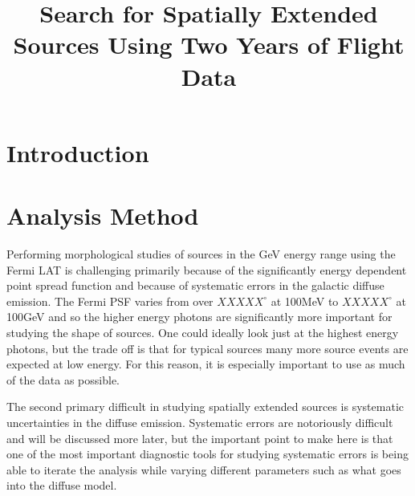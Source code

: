 \documentclass[12pt]{article}
\title{Search for Spatially Extended Sources Using Two Years of Flight
Data}
\begin{document}
\maketitle


\section{Introduction}



\section{Analysis Method}


%

Performing morphological studies of sources in the GeV energy range using
the Fermi LAT is challenging primarily because of the significantly energy
dependent point spread function and because of systematic errors in the
galactic diffuse emission. The Fermi PSF varies from over $XXXXX^\circ$
at 100MeV to $XXXXX^\circ$ at 100GeV and so the higher energy photons are
significantly more important for studying the shape of sources. One could
ideally look just at the highest energy photons, but the trade off is that
for typical sources many more source events are expected at low energy.
For this reason, it is especially important to use as much of the data
as possible.

The second primary difficult in studying spatially extended sources is
systematic uncertainties in the diffuse emission. Systematic errors are
notoriously difficult and will be discussed more later, but the important
point to make here is that one of the most important diagnostic tools for
studying systematic errors is being able to iterate the analysis while
varying different parameters such as what goes into the diffuse model.
\end{document}
